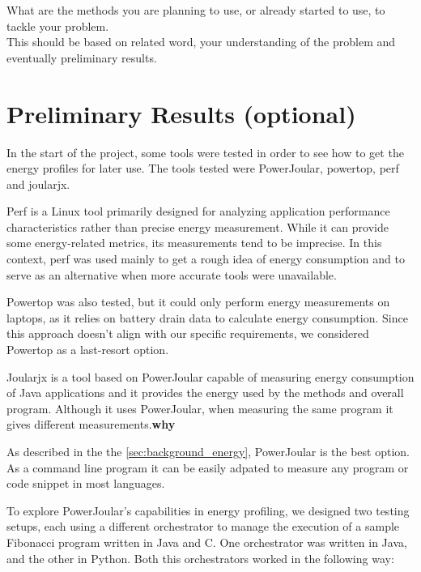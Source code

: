 \documentclass[sigplan]{acmart}
\begin{document}
What are the methods you are planning to use, or already started to use, to tackle your problem. \\

This should be based on related word, your understanding of the problem and eventually preliminary results.

\section{Preliminary Results (optional)} \label{sec:preliminaryresults}

In the start of the project, some tools were tested in order to see how to get the energy profiles for later use. The tools tested were PowerJoular, powertop, perf and joularjx.

Perf is a Linux tool primarily designed for analyzing application performance characteristics rather than precise energy measurement. While it can provide some energy-related metrics, its measurements tend to be imprecise. In this context, perf was used mainly to get a rough idea of energy consumption and to serve as an alternative when more accurate tools were unavailable.

Powertop was also tested, but it could only perform energy measurements on laptops, as it relies on battery drain data to calculate energy consumption. Since this approach doesn't align with our specific requirements, we considered Powertop as a last-resort option.

Joularjx is a tool based on PowerJoular capable of measuring energy consumption of Java applications and it provides the energy used by the methods and overall program. Although it uses PowerJoular, when measuring the same program it gives different measurements.\textbf{why}

As described in the the \ref{sec:background_energy}, PowerJoular is the best option. As a command line program it can be easily adpated to measure any program or code snippet in most languages.

To explore PowerJoular’s capabilities in energy profiling, we designed two testing setups, each using a different orchestrator to manage the execution of a sample Fibonacci program written in Java and C. One orchestrator was written in Java, and the other in Python. Both this orchestrators worked in the following way: \\
\end{document}
